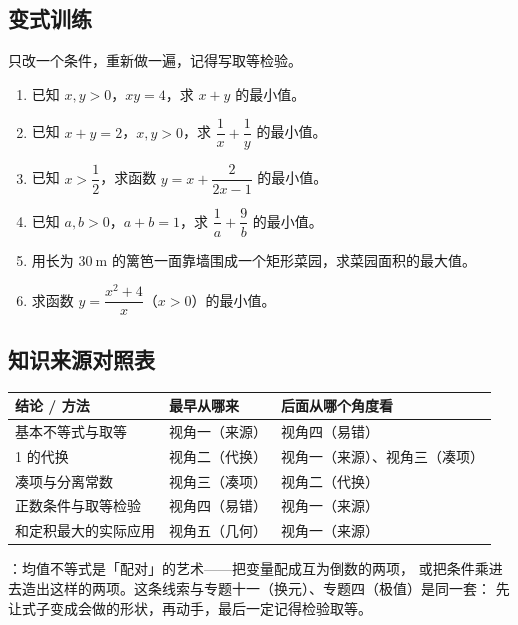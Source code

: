 \begin{inclasstest}
\subsection{变式训练}
只改一个条件，重新做一遍，记得写取等检验。
\begin{enumerate}
  \item 已知 $x,y>0$，$xy=4$，求 $x+y$ 的最小值。
  \item 已知 $x+y=2$，$x,y>0$，求 $\dfrac1x+\dfrac1y$ 的最小值。
  \item 已知 $x>\dfrac12$，求函数 $y=x+\dfrac{2}{2x-1}$ 的最小值。
  \item 已知 $a,b>0$，$a+b=1$，求 $\dfrac1a+\dfrac9b$ 的最小值。
  \item 用长为 $30\ \mathrm{m}$ 的篱笆一面靠墙围成一个矩形菜园，求菜园面积的最大值。
  \item 求函数 $y=\dfrac{x^2+4}{x}$（$x>0$）的最小值。
\end{enumerate}
\end{inclasstest}

\begin{afterclass}
\subsection{知识来源对照表}
\begin{center}
\footnotesize
\setlength{\tabcolsep}{4pt}
\renewcommand{\arraystretch}{1.35}
\begin{tabular}{p{3.4cm}p{4.0cm}p{5.6cm}}
\toprule
结论 / 方法 & 最早从哪来 & 后面从哪个角度看 \\
\midrule
基本不等式与取等 & 视角一（来源） & 视角四（易错） \\
1 的代换 & 视角二（代换） & 视角一（来源）、视角三（凑项） \\
凑项与分离常数 & 视角三（凑项） & 视角二（代换） \\
正数条件与取等检验 & 视角四（易错） & 视角一（来源） \\
和定积最大的实际应用 & 视角五（几何） & 视角一（来源） \\
\bottomrule
\end{tabular}
\end{center}

：均值不等式是「配对」的艺术——把变量配成互为倒数的两项，
或把条件乘进去造出这样的两项。这条线索与专题十一（换元）、专题四（极值）是同一套：
先让式子变成会做的形状，再动手，最后一定记得检验取等。
\end{afterclass}
